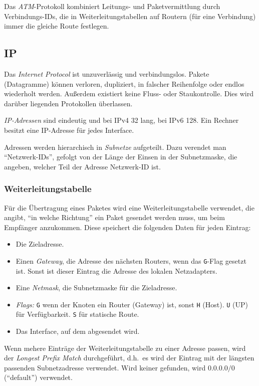 \documentclass[a4paper,parskip=half*,DIV=15,fontsize=11pt]{scrartcl}
\begin{document}
Das \emph{ATM}-Protokoll kombiniert Leitungs- und Paketvermittlung durch Verbindungs-IDs, die in Weiterleitungstabellen auf Routern (für eine Verbindung) immer die gleiche Route festlegen.

\subsection{IP}

Das \emph{Internet Protocol} ist unzuverlässig und verbindungslos. Pakete (Datagramme) können verloren, dupliziert, in falscher Reihenfolge oder endlos wiederholt werden. Außerdem existiert keine Fluss- oder Staukontrolle. Dies wird darüber liegenden Protokollen überlassen.

\emph{IP-Adressen} sind eindeutig und bei IPv4 \SI{32}{\bit} lang, bei IPv6 \SI{128}{\bit}. Ein Rechner besitzt eine IP-Adresse für jedes Interface.

Adressen werden hierarchisch in \emph{Subnetze} aufgeteilt. Dazu verendet man ``Netzwerk-IDs'', gefolgt von der Länge der Einsen in der Subnetzmaske, die angeben, welcher Teil der Adresse Netzwerk-ID ist.

\subsubsection{Weiterleitungstabelle}

Für die Übertragung eines Paketes wird eine Weiterleitungstabelle verwendet, die angibt, ``in welche Richtung'' ein Paket gesendet werden muss, um beim Empfänger anzukommen. Diese speichert die folgenden Daten für jeden Eintrag:

\begin{itemize}
\item Die Zieladresse.
\item Einen \emph{Gateway}, die Adresse des nächsten Routers, wenn das \lstinline{G}-Flag gesetzt ist. Sonst ist dieser Eintrag die Adresse des lokalen Netzadapters.
\item Eine \emph{Netmask}, die Subnetzmaske für die Zieladresse.
\item \emph{Flags:} \lstinline{G} wenn der Knoten ein Router (Gateway) ist, sonst \lstinline{H} (Host). \lstinline{U} (UP) für Verfügbarkeit. \lstinline{S} für statische Route.
\item Das Interface, auf dem abgesendet wird.
\end{itemize}

Wenn mehere Einträge der Weiterleitungstabelle zu einer Adresse passen, wird der \emph{Longest Prefix Match} durchgeführt, d.h.\ es wird der Eintrag mit der längsten passenden Subnetzadresse verwendet. Wird keiner gefunden, wird $0.0.0.0/0$ (``default'') verwendet.
\end{document}
